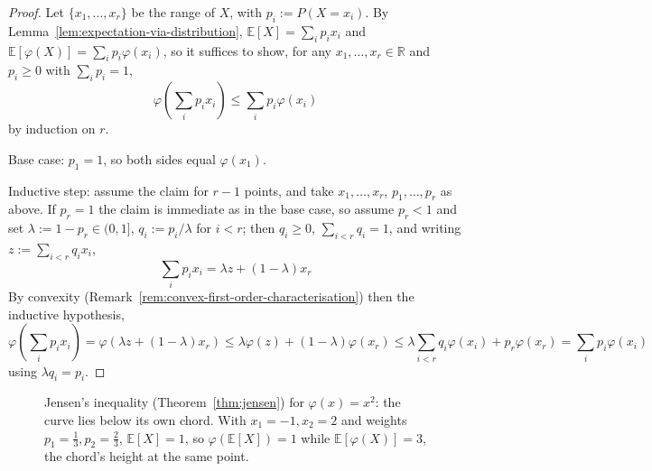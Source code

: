 		\begin{proof}
			Let $\{x_1,\dots,x_r\}$ be the range of $X$, with $p_i:=P(X=x_i)$. By Lemma~\ref{lem:expectation-via-distribution}, $\mathbb{E}[X]=\sum_ip_ix_i$ and $\mathbb{E}[\varphi(X)]=\sum_ip_i\varphi(x_i)$, so it suffices to show, for any $x_1,\dots,x_r\in\mathbb{R}$ and $p_i\ge0$ with $\sum_ip_i=1$,
			\[
				\varphi\left(\sum_i p_ix_i\right) \le \sum_i p_i\varphi(x_i)
			\]
			by induction on $r$.
			
			Base case: $p_1=1$, so both sides equal $\varphi(x_1)$.
			
			Inductive step: assume the claim for $r-1$ points, and take $x_1,\dots,x_r$, $p_1,\dots,p_r$ as above. If $p_r=1$ the claim is immediate as in the base case, so assume $p_r<1$ and set $\lambda:=1-p_r\in(0,1]$, $q_i:=p_i/\lambda$ for $i<r$; then $q_i\ge0$, $\sum_{i<r}q_i=1$, and writing $z:=\sum_{i<r}q_ix_i$,
			\[
				\sum_i p_ix_i = \lambda z+(1-\lambda)x_r
			\]
			By convexity (Remark~\ref{rem:convex-first-order-characterisation}) then the inductive hypothesis,
			\[
				\varphi\left(\sum_i p_ix_i\right) = \varphi(\lambda z+(1-\lambda)x_r) \le \lambda\varphi(z)+(1-\lambda)\varphi(x_r) \le \lambda\sum_{i<r}q_i\varphi(x_i)+p_r\varphi(x_r) = \sum_i p_i\varphi(x_i)
			\]
			using $\lambda q_i=p_i$.
		\end{proof}
		
		\begin{figure}[h]
			\centering
			\caption{Jensen's inequality (Theorem~\ref{thm:jensen}) for $\varphi(x)=x^2$: the curve lies below its own chord. With $x_1=-1,x_2=2$ and weights $p_1=\frac13,p_2=\frac23$, $\mathbb{E}[X]=1$, so $\varphi(\mathbb{E}[X])=1$ while $\mathbb{E}[\varphi(X)]=3$, the chord's height at the same point.}
			\label{fig:jensen}
		\end{figure}
		
